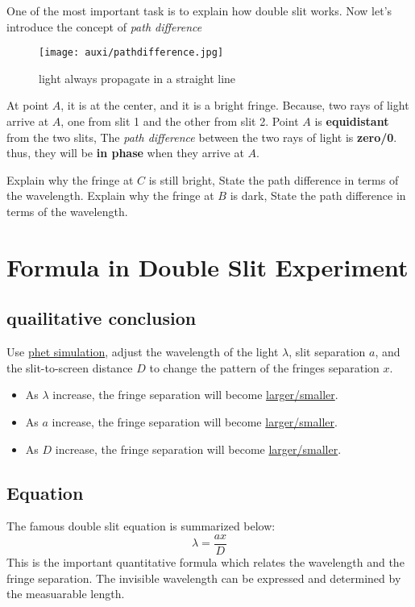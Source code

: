 \documentclass[a4paper]{tufte-handout}
\newenvironment{TaskBox} %
{\begin{tcolorbox}[breakable,colback=b1!30,colframe=b1,title=Task]} {\end{tcolorbox}}
\newenvironment{SummBox}
{\begin{tcolorbox}[breakable,colback=r1!30,colframe=r1,title=Summary]} {\end{tcolorbox}}
\begin{document}
One of the most important task is to explain how double slit works. Now let's introduce the concept of \emph{path difference}
\begin{figure}[h]
\centering
\texttt{[image: auxi/pathdifference.jpg]}
\caption{light always propagate in a straight line}
\label{fig:path difference-ray}
\end{figure}

At point $A$, it is at the center, and it is a bright fringe. Because, two rays of light arrive at $A$, one from slit 1 and the other from slit 2. Point $A$ is \textbf{equidistant} from the two slits, The \emph{path difference} between the two rays of light is \textbf{zero/0}. thus, they will be \textbf{in phase} when they arrive at $A$.

\begin{TaskBox}
Explain why the fringe at $C$ is still bright, State the path difference in terms of the wavelength.
\tcblower
Explain why the fringe at $B$ is dark, State the path difference in terms of the wavelength.
\end{TaskBox}

\section{Formula in Double Slit Experiment}
\subsection{quailitative conclusion}
Use \href{https://phet.colorado.edu/en/simulations/wave-interference}{phet simulation}, adjust the wavelength of the light $\lambda$, slit separation $a$, and the slit-to-screen distance $D$ to change the pattern of the fringes separation $x$.

\begin{SummBox}
\begin{itemize}
  \item As $\lambda$ increase, the fringe separation will become \uline{larger/smaller}.
  \item As $a$ increase, the fringe separation will become \uline{larger/smaller}.
  \item As $D$ increase, the fringe separation will become \uline{larger/smaller}.
\end{itemize}
\end{SummBox}

\subsection{Equation}
The famous double slit equation is summarized below:
\[
  \lambda = \frac{ax}{D}
\]
This is the important quantitative formula which relates the wavelength and the fringe separation. The invisible wavelength can be expressed and determined by the measuarable length.
\end{document}

